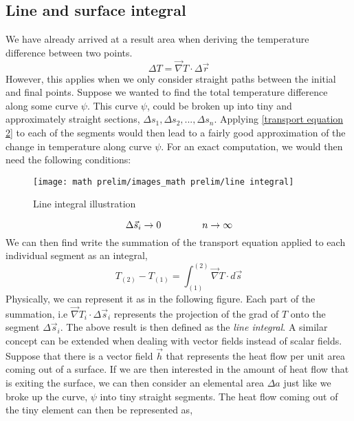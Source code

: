 \subsection{Line and surface integral}
We have already arrived at a result area when deriving the temperature difference between two points. 
\begin{equation}
	\label{transport equation 2}
	\Delta T = \vec{\nabla} T \cdot \Delta \vec{r}
\end{equation}
However, this applies when we only consider straight paths between the initial and final points. Suppose we wanted to find the total temperature difference along some curve $\psi$. This curve $\psi$, could be broken up into tiny and approximately straight sections, $\Delta s_{1}, \Delta s_{2}, ..., \Delta s_{n}$. Applying \autoref{transport equation 2} to each of the segments would then lead to a fairly good approximation of the change in temperature along curve $\psi$. For an exact computation, we would then need the following conditions: 
\begin{figure}[H]
    \centering
    \texttt{[image: math prelim/images\_math prelim/line integral]}
    \caption{Line integral illustration}
    \label{Line int pic}
\end{figure}
\begin{equation}
	\Delta \vec{s}_{i} \to 0 \hspace{15mm} n \to \infty 
\end{equation}
We can then find write the summation of the transport equation applied to each individual segment as an integral, 
\begin{equation}
	\label{line integral def}
	T_{(2)} - T_{(1)} = \int_{(1)}^{(2)} \vec{\nabla} T \cdot d\vec{s}
\end{equation}
Physically, we can represent it as in the following figure. Each part of the summation, i.e $\vec{\nabla} T_{i} \cdot \Delta \vec{s}_{i}$ represents the projection of the grad of $T$ onto the segment $\Delta \vec{s}_{i}$. The above result is then defined as the \emph{line integral}. A similar concept can be extended when dealing with vector fields instead of scalar fields. Suppose that there is a vector field $\vec{h}$ that represents the heat flow per unit area coming out of a surface. If we are then interested in the amount of heat flow that is exiting the surface, we can then consider an elemental area $\Delta a$ just like we broke up the curve, $\psi$ into tiny straight segments. The heat flow coming out of the tiny element can then be represented as, 
